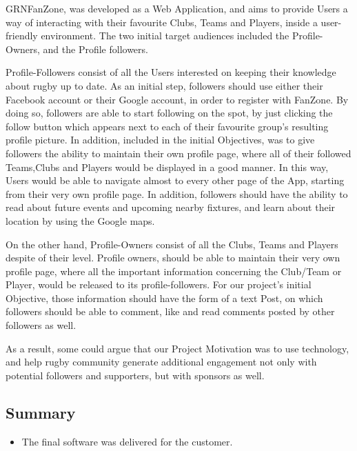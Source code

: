 \documentclass{l3proj}
\begin{document}
GRNFanZone, was developed as a Web Application, and aims to provide Users a way of
interacting with their favourite Clubs, Teams and Players, inside a user-friendly
environment. The two initial target audiences included the Profile-Owners, and the
Profile followers.

Profile-Followers consist of all the Users interested on keeping their knowledge about
rugby up to date. As an initial step, followers should use either their Facebook account
or their Google account, in order to register with FanZone. By doing so, followers
are able to start following on the spot, by just clicking the follow button which
appears next to each of their favourite group's resulting profile picture. In addition,
included in the initial Objectives, was to give followers the ability to maintain their
own profile page, where all of their followed Teams,Clubs and Players would be displayed
in a good manner. In this way, Users would be able to navigate almost to every other
page of the App, starting from their very own profile page. In addition, followers
should have the ability to read about future events and upcoming nearby fixtures, and
learn about their location by using the Google maps.

On the other hand, Profile-Owners consist of all the Clubs, Teams and Players despite
of their level. Profile owners, should be able to maintain their very own profile page,
where all the important information concerning the Club/Team or Player, would be released
to its profile-followers. For our project's initial Objective, those information should
have the form of a text Post, on which followers should be able to comment, like and read
comments posted by other followers as well.

As a result, some could argue that our Project Motivation was to use technology, and help
rugby community generate additional engagement not only with potential followers and
supporters, but with sponsors as well.

\subsection{Summary}
\begin{itemize}
\item The final software was delivered for the customer.
\end{itemize}
%
\newpage
\end{document}
